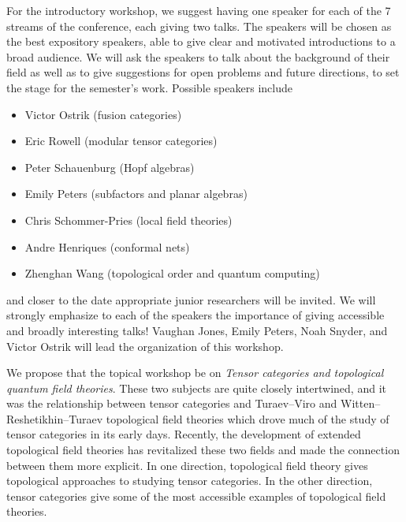 \documentclass[12pt]{article}
\begin{document}
For the introductory workshop, we suggest having one speaker for each of the 7 streams of the conference, each giving two talks.
The speakers will be chosen as the best expository speakers, able to give clear and motivated introductions to a broad audience. We will ask the speakers to talk about the background of their field as well as to give suggestions for open problems and future directions, to set the stage for the semester's work. Possible speakers include
\begin{itemize}
  \setlength{\itemsep}{1pt}
  \setlength{\parskip}{0pt}
  \setlength{\parsep}{0pt}
\item Victor Ostrik (fusion categories) 
\item Eric Rowell (modular tensor categories)
\item Peter Schauenburg (Hopf algebras)
\item Emily Peters (subfactors and planar algebras) %
\item Chris Schommer-Pries (local field theories) %
\item Andre Henriques (conformal nets) %
\item Zhenghan Wang (topological order and quantum computing) %
\end{itemize}
and closer to the date appropriate junior researchers will be invited. 
We will strongly emphasize to each of the speakers the importance of giving accessible and broadly interesting talks!
Vaughan Jones, Emily Peters, Noah Snyder, and Victor Ostrik will lead the organization of this workshop.

We propose that the topical workshop be on \emph{Tensor categories and topological quantum field theories}. These two subjects are quite closely intertwined, and it was the relationship between tensor categories and Turaev--Viro and Witten--Reshetikhin--Turaev topological field theories which drove much of the study of tensor categories in its early days.  Recently, the development of extended topological field theories has revitalized these two fields and made the connection between them more explicit. In one direction, topological field theory gives topological approaches to studying tensor categories. In the other direction, tensor categories give some of the most accessible examples of topological field theories.
\end{document}
